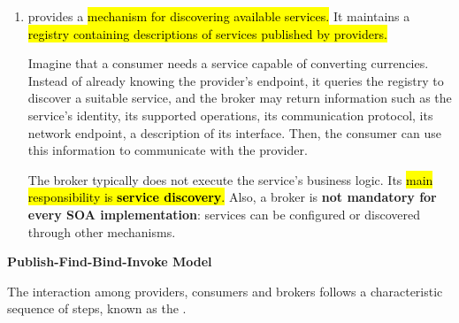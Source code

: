 \begin{enumerate}[label={\Alph*.}]
        Importantly, \hl{a component may simultaneously be a provider and a consumer.} For example, an order service might consume a payment service to process payments, while also providing its own order management service to other components. This is similar to the client-server roles, where a server can also act as a client to another server.

    \item\label{def:service-broker}  provides a \hl{mechanism for discovering available services.} It maintains a \hl{registry containing descriptions of services published by providers.}

        \begin{examplebox}
            Imagine that a consumer needs a service capable of converting currencies. Instead of already knowing the provider's endpoint, it queries the registry to discover a suitable service, and the broker may return information such as the service's identity, its supported operations, its communication protocol, its network endpoint, a description of its interface. Then, the consumer can use this information to communicate with the provider.
        \end{examplebox}

        The broker typically does not execute the service's business logic. Its \hl{main responsibility is \textbf{service discovery}.} Also, a broker is \textbf{not mandatory for every SOA implementation}: services can be configured or discovered through other mechanisms.
\end{enumerate}

\newpage

\begin{flushleft}
    \textcolor{Green3}{ \textbf{Publish-Find-Bind-Invoke Model}}
\end{flushleft}
The interaction among providers, consumers and brokers follows a characteristic sequence of steps, known as the .

